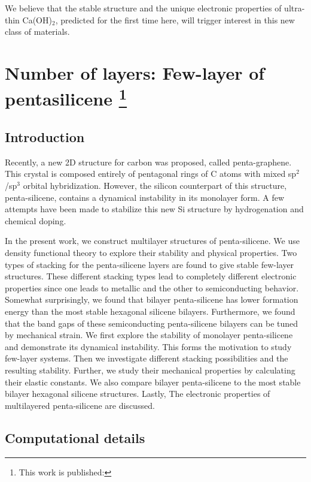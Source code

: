 We believe that the stable structure and the unique electronic properties of ultra-thin 
Ca(OH)$_2$, predicted for the first time here, will trigger interest in this 
new class of materials. 

\section[Number of layers: Few-layer of pentasilicene]{Number of layers: Few-layer of pentasilicene \footnote{This work is published:\cite{Aierken2016.pentasilicene}} \label{pSi_layers}}

\subsection{Introduction\label{intro}}

Recently, a new 2D structure for carbon was proposed, called penta-graphene\cite{Zhang2015}. This crystal is composed entirely of pentagonal rings of C atoms with mixed sp$^2$/sp$^3$ orbital hybridization.  However, the silicon counterpart of this structure, penta-silicene, contains a dynamical instability in its monolayer form. A few attempts have been made to stabilize this new Si structure by hydrogenation\cite{Ding2015} and chemical doping\cite{Li2015b}. 

In the present work, we construct multilayer structures of penta-silicene. We use density functional theory to explore their stability and physical properties. Two types of stacking for the penta-silicene layers are found to give stable few-layer structures. These different stacking types lead to completely different electronic properties since one leads to metallic and the other to semiconducting behavior. Somewhat surprisingly, we found that bilayer penta-silicene has lower formation energy than the most stable hexagonal silicene bilayers. Furthermore, we found that the band gaps of these semiconducting penta-silicene bilayers can be tuned by mechanical strain. We first explore the stability of monolayer penta-silicene and demonstrate its dynamical instability. This forms the motivation to study few-layer systems. Then we investigate different stacking possibilities and the resulting stability. Further, we study their mechanical properties by calculating their elastic constants.  We also compare bilayer penta-silicene to the most stable bilayer hexagonal silicene structures. Lastly, The electronic properties of multilayered penta-silicene are discussed.

\subsection{Computational details}

